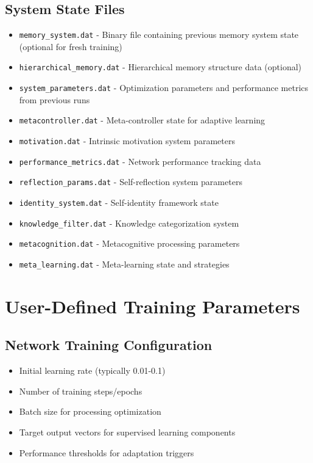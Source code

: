 \documentclass[11pt,a4paper]{article}
\begin{document}
\subsection{System State Files}
\begin{itemize}[leftmargin=0.5in]
    \item \texttt{memory\_system.dat} - Binary file containing previous 
    memory system state (optional for fresh training)
    
    \item \texttt{hierarchical\_memory.dat} - Hierarchical memory structure 
    data (optional)
    
    \item \texttt{system\_parameters.dat} - Optimization parameters and 
    performance metrics from previous runs
    
    \item \texttt{metacontroller.dat} - Meta-controller state for adaptive 
    learning
    
    \item \texttt{motivation.dat} - Intrinsic motivation system parameters
    
    \item \texttt{performance\_metrics.dat} - Network performance tracking 
    data
    
    \item \texttt{reflection\_params.dat} - Self-reflection system 
    parameters
    
    \item \texttt{identity\_system.dat} - Self-identity framework state
    
    \item \texttt{knowledge\_filter.dat} - Knowledge categorization system
    
    \item \texttt{metacognition.dat} - Metacognitive processing parameters
    
    \item \texttt{meta\_learning.dat} - Meta-learning state and strategies
\end{itemize}

\section{User-Defined Training Parameters}

\subsection{Network Training Configuration}
\begin{itemize}[leftmargin=0.5in]
    \item Initial learning rate (typically 0.01-0.1)
    \item Number of training steps/epochs
    \item Batch size for processing optimization
    \item Target output vectors for supervised learning components
    \item Performance thresholds for adaptation triggers
\end{itemize}
\end{document}
